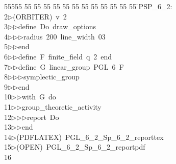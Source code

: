 %
%
\begin{tabbing}
55555 \= 55 \= 55 \= 55 \= 55 \= 55 \= 55 \= 55 \= 55 \= 55 \= 55 \= 55 \= 55 \= \>PSP\_6\_2:\\[0pt]
2\>$\triangleright$\>(ORBITER)\ v\ 2\ \\[0pt]
3\>$\triangleright$\>$\triangleright$\>define\ Do\ draw\_options\ \\[0pt]
4\>$\triangleright$\>$\triangleright$\>$\triangleright$\>radius\ 200\ line\_width\ 03\ \\[0pt]
5\>$\triangleright$\>$\triangleright$\>end\ \\[0pt]
6\>$\triangleright$\>$\triangleright$\>define\ F\ finite\_field\ q\ 2\ end\ \\[0pt]
7\>$\triangleright$\>$\triangleright$\>define\ G\ linear\_group\ PGL\ 6\ F\ \\[0pt]
8\>$\triangleright$\>$\triangleright$\>$\triangleright$\>symplectic\_group\ \\[0pt]
9\>$\triangleright$\>$\triangleright$\>end\ \\[0pt]
10\>$\triangleright$\>$\triangleright$\>with\ G\ do\ \\[0pt]
11\>$\triangleright$\>$\triangleright$\>group\_theoretic\_activity\ \\[0pt]
12\>$\triangleright$\>$\triangleright$\>$\triangleright$\>report\ Do\ \\[0pt]
13\>$\triangleright$\>$\triangleright$\>end\\[0pt]
14\>$\triangleright$\>(PDFLATEX)\ PGL\_6\_2\_Sp\_6\_2\_reporttex\\[0pt]
15\>$\triangleright$\>(OPEN)\ PGL\_6\_2\_Sp\_6\_2\_reportpdf\\[0pt]
16\>\end{tabbing}
